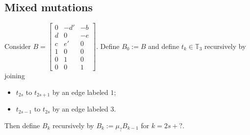 \documentclass{amsart}
\numberwithin{theorem}{section}
\newcommand{\TT}{\mathbb{T}}
\begin{document}
  \subsection{Mixed mutations}

  Consider $B=\left[\begin{array}{ccc} 0 & -d' & -b \\ d & 0 & -e\\ c & e' & 0\\ 1 & 0 & 0\\ 0 & 1 & 0\\ 0 & 0 & 1\end{array}\right]$.
  Define $B_0:=B$ and define $t_k\in\TT_3$ recursively by joining 
  \begin{itemize}
    \item $t_{2s}$ to $t_{2s+1}$ by an edge labeled $1$;
    \item $t_{2s-1}$ to $t_{2s}$ by an edge labeled $3$.
  \end{itemize}
  Then define $B_k$ recursively by $B_k:=\mu_? B_{k-1}$ for $k=2s+?$.
\end{document}

